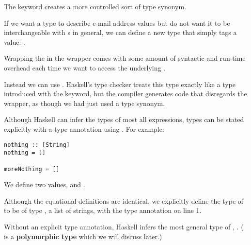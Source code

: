 \begin{notelist}
\item The keyword  creates a more controlled sort of type synonym.
\begin{notelist}
    \item If we want a type to describe e-mail address values but do not want it to be
          interchangeable with s in general, we can define a new type that simply tags
          a  value: .
    \item Wrapping the  in the  wrapper comes with some amount of syntactic and run-time
          overhead each time we want to access the underlying .
    \item Instead we can use . Haskell's type checker treats
          this type exactly like a type introduced with the  keyword, but the compiler generates code
          that disregards the wrapper, as though we had just used a type synonym.
\end{notelist}

\item Although Haskell can infer the types of most all expressions, types can be stated explicitly
      with a type annotation using \code{::}. For example:
\begin{lstlisting}
nothing :: [String]
nothing = []

moreNothing = []
\end{lstlisting}
\begin{notelist}
    \item We define two values,  and .
    \item Although the equational definitions are identical, we explicitly define the type of
           to be of type \code{[String]}, a list of strings, with the type
          annotation on line 1.
    \item Without an explicit type annotation, Haskell infers the most general type of ,
          \code{[a]}. (\code{[a]} is a \textbf{polymorphic type} which we will discuss later.)
\end{notelist}


\end{notelist}
